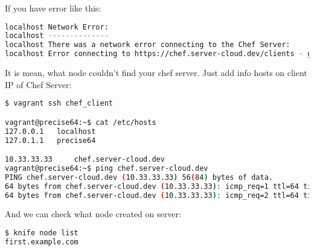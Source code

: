 If you have error like this:

\begin{lstlisting}[language=Bash,label=lst:my-server-cloud-node4]
localhost Network Error:
localhost --------------
localhost There was a network error connecting to the Chef Server:
localhost Error connecting to https://chef.server-cloud.dev/clients - getaddrinfo: Name or service not known
\end{lstlisting}

It is mean, what node couldn't find your chef server. Just add info hosts on client IP of Chef Server:

\begin{lstlisting}[language=Bash,label=lst:my-server-cloud-node5]
$ vagrant ssh chef_client

vagrant@precise64:~$ cat /etc/hosts
127.0.0.1	localhost
127.0.1.1	precise64

10.33.33.33		chef.server-cloud.dev
vagrant@precise64:~$ ping chef.server-cloud.dev
PING chef.server-cloud.dev (10.33.33.33) 56(84) bytes of data.
64 bytes from chef.server-cloud.dev (10.33.33.33): icmp_req=1 ttl=64 time=0.623 ms
64 bytes from chef.server-cloud.dev (10.33.33.33): icmp_req=2 ttl=64 time=0.466 ms
\end{lstlisting}

And we can check what node created on server:

\begin{lstlisting}[language=Bash,label=lst:my-server-cloud-node6]
$ knife node list
first.example.com
\end{lstlisting}